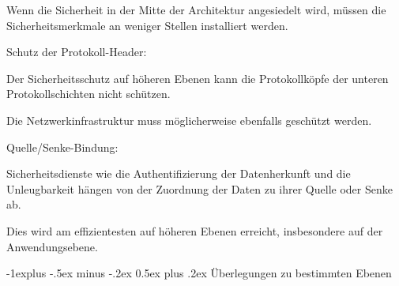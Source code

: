 \documentclass[a4paper]{article}
\makeatletter
\renewcommand{\subsection}{\@startsection{subsection}{2}{0mm}%
 {-1explus -.5ex minus -.2ex}%
 {0.5ex plus .2ex}%
 {\normalfont\normalsize\bfseries}}
\makeatother
\begin{document}
\begin{multicols}{3}
\begin{itemize*}
\begin{itemize*}
                  \item Wenn die Sicherheit in der Mitte der Architektur angesiedelt wird, müssen die Sicherheitsmerkmale an weniger Stellen installiert werden.
            \end{itemize*}
            \item Schutz der Protokoll-Header:
            \begin{itemize*}
                  \item Der Sicherheitsschutz auf höheren Ebenen kann die Protokollköpfe der unteren Protokollschichten nicht schützen.
                  \item Die Netzwerkinfrastruktur muss möglicherweise ebenfalls geschützt werden.
            \end{itemize*}
            \item Quelle/Senke-Bindung:
            \begin{itemize*}
                  \item Sicherheitsdienste wie die Authentifizierung der Datenherkunft und die Unleugbarkeit hängen von der Zuordnung der Daten zu ihrer Quelle oder Senke ab.
                  \item Dies wird am effizientesten auf höheren Ebenen erreicht, insbesondere auf der Anwendungsebene.
            \end{itemize*}
      \end{itemize*}


      \subsection{Überlegungen zu bestimmten
            Ebenen}


\end{multicols}
\end{document}
